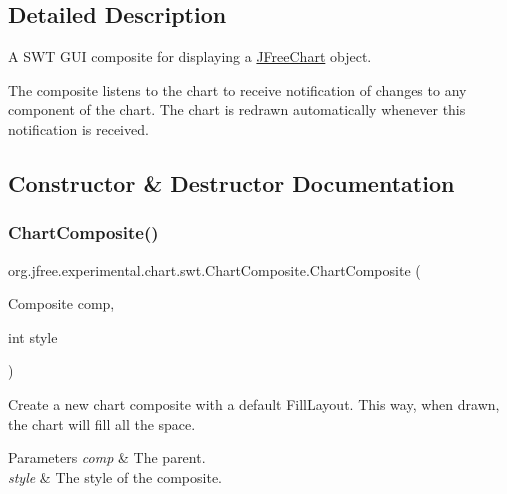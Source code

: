 \subsection{Detailed Description}
A S\+WT G\+UI composite for displaying a \mbox{\hyperlink{}{J\+Free\+Chart}} object. 

The composite listens to the chart to receive notification of changes to any component of the chart. The chart is redrawn automatically whenever this notification is received. 

\subsection{Constructor \& Destructor Documentation}
\mbox{\label{classorg_1_1jfree_1_1experimental_1_1chart_1_1swt_1_1_chart_composite_a231c3eb3b023cc4b230788640361f5b4}} 
\subsubsection{\texorpdfstring{Chart\+Composite()}{ChartComposite()}\hspace{0.1cm}{\footnotesize\ttfamily [1/5]}}
{\footnotesize\ttfamily org.\+jfree.\+experimental.\+chart.\+swt.\+Chart\+Composite.\+Chart\+Composite (\begin{DoxyParamCaption}\item[{Composite}]{comp,  }\item[{int}]{style }\end{DoxyParamCaption})}

Create a new chart composite with a default Fill\+Layout. This way, when drawn, the chart will fill all the space. 
\begin{DoxyParams}{Parameters}
{\em comp} & The parent. \\
\hline
{\em style} & The style of the composite. \\
\hline
\end{DoxyParams}
\mbox{\label{classorg_1_1jfree_1_1experimental_1_1chart_1_1swt_1_1_chart_composite_ae006da3e28b683c1a0758e1981ea337d}} 
